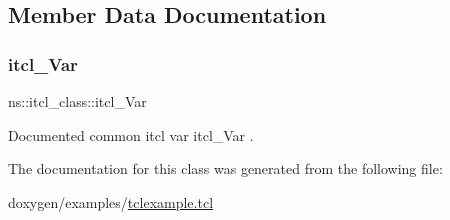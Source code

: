 \subsection{Member Data Documentation}
\mbox{\label{classns_1_1itcl__class_a8df46696ce554fed04d170932260fbb8}} 
\subsubsection{\texorpdfstring{itcl\_Var}{itcl\_Var}}
{\footnotesize\ttfamily ns\+::itcl\+\_\+class\+::itcl\+\_\+\+Var\hspace{0.3cm}{\ttfamily [static]}}

Documented common itcl var {\ttfamily itcl\+\_\+\+Var} . 

The documentation for this class was generated from the following file\+:\begin{DoxyCompactItemize}
\item 
doxygen/examples/\mbox{\hyperlink{tclexample_8tcl}{tclexample.\+tcl}}\end{DoxyCompactItemize}
